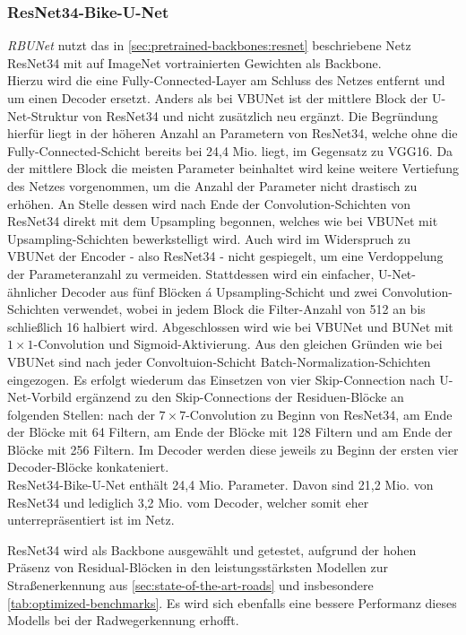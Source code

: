\subsubsection{ResNet34-Bike-U-Net}

\textit{\ac{RBUNet}} nutzt das in \autoref{sec:pretrained-backbones:resnet} beschriebene Netz ResNet34 
mit auf ImageNet vortrainierten Gewichten als Backbone. \\
Hierzu wird die eine Fully-Connected-Layer am Schluss des Netzes entfernt und um einen Decoder ersetzt. 
Anders als bei \ac{VBUNet} ist der mittlere Block der U-Net-Struktur von ResNet34 
und nicht zusätzlich neu ergänzt. Die Begründung hierfür liegt in der höheren Anzahl an Parametern 
von ResNet34, welche ohne die Fully-Connected-Schicht bereits bei 24,4 Mio. liegt, im Gegensatz zu VGG16. 
Da der mittlere Block die meisten Parameter beinhaltet wird keine weitere Vertiefung des Netzes vorgenommen,
um die Anzahl der Parameter nicht drastisch zu erhöhen. An Stelle dessen wird nach Ende der Convolution-Schichten von 
ResNet34 direkt mit dem Upsampling begonnen, welches wie bei \ac{VBUNet} mit Upsampling-Schichten 
bewerkstelligt wird. Auch wird im Widerspruch zu \ac{VBUNet} der Encoder - also ResNet34 - nicht gespiegelt, 
um eine Verdoppelung der Parameteranzahl zu vermeiden. Stattdessen wird ein einfacher, U-Net-ähnlicher Decoder
aus fünf Blöcken á Upsampling-Schicht und zwei Convolution-Schichten verwendet, wobei in jedem Block 
die Filter-Anzahl von 512 an bis schließlich 16 halbiert wird. Abgeschlossen wird wie bei \ac{VBUNet} und
\ac{BUNet} mit $1\times 1$-Convolution und Sigmoid-Aktivierung. Aus den gleichen Gründen wie bei \ac{VBUNet}
sind nach jeder Convoltuion-Schicht Batch-Normalization-Schichten eingezogen. 
Es erfolgt wiederum das Einsetzen von vier Skip-Connection nach U-Net-Vorbild ergänzend zu den 
Skip-Connections der Residuen-Blöcke an folgenden Stellen: 
nach der $7\times 7$-Convolution zu Beginn von ResNet34, 
am Ende der Blöcke mit 64 Filtern, am Ende der Blöcke mit 128 Filtern 
und am Ende der Blöcke mit 256 Filtern. Im Decoder werden diese jeweils 
zu Beginn der ersten vier Decoder-Blöcke konkateniert. \\ 
ResNet34-Bike-U-Net enthält 24,4 Mio. Parameter. Davon sind 21,2 Mio. von ResNet34 und lediglich 3,2 Mio. 
vom Decoder, welcher somit eher unterrepräsentiert ist im Netz.  

ResNet34 wird als Backbone ausgewählt und getestet, aufgrund der hohen Präsenz von 
Residual-Blöcken in den leistungsstärksten Modellen 
zur Straßenerkennung aus \autoref{sec:state-of-the-art-roads} und insbesondere \autoref{tab:optimized-benchmarks}.
Es wird sich ebenfalls eine bessere Performanz dieses Modells bei der Radwegerkennung erhofft. 

